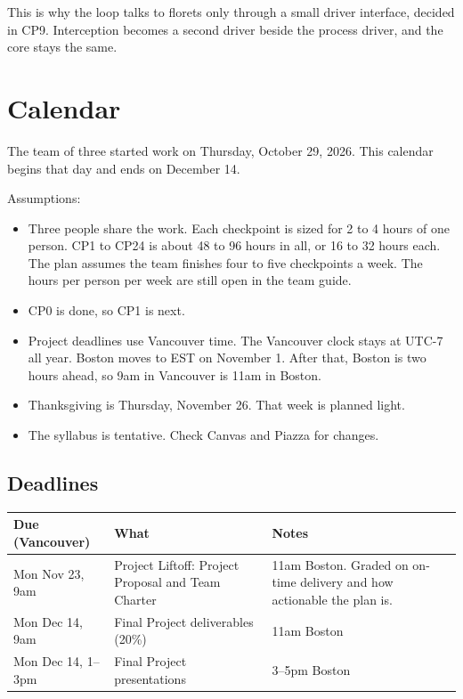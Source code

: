 \documentclass[11pt,letterpaper]{article}
\begin{document}
This is why the loop talks to florets only through a small driver interface, decided in CP9. Interception becomes a second driver beside the process driver, and the core stays the same.

\section{Calendar}

The team of three started work on Thursday, October 29, 2026. This calendar begins that day and ends on December 14.

Assumptions:

\begin{itemize}
  \item Three people share the work. Each checkpoint is sized for 2 to 4 hours of one person. CP1 to CP24 is about 48 to 96 hours in all, or 16 to 32 hours each. The plan assumes the team finishes four to five checkpoints a week. The hours per person per week are still open in the team guide.
  \item CP0 is done, so CP1 is next.
  \item Project deadlines use Vancouver time. The Vancouver clock stays at UTC-7 all year. Boston moves to EST on November 1. After that, Boston is two hours ahead, so 9am in Vancouver is 11am in Boston.
  \item Thanksgiving is Thursday, November 26. That week is planned light.
  \item The syllabus is tentative. Check Canvas and Piazza for changes.
\end{itemize}

\subsection{Deadlines}

\begin{center}
\small
\begin{tabularx}{\linewidth}{@{}l X X@{}}
\toprule
\textbf{Due (Vancouver)} & \textbf{What} & \textbf{Notes} \\
\midrule
Mon Nov 23, 9am & Project Liftoff: Project Proposal and Team Charter & 11am Boston. Graded on on-time delivery and how actionable the plan is. \\
Mon Dec 14, 9am & Final Project deliverables (20\%) & 11am Boston \\
Mon Dec 14, 1--3pm & Final Project presentations & 3--5pm Boston \\
\bottomrule
\end{tabularx}
\end{center}
\end{document}
